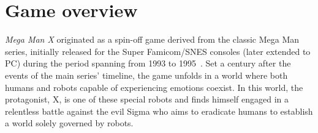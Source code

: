 \chapter{Game overview}
\textit{Mega Man X} originated as a spin-off game derived from the classic Mega Man series, initially released for the Super Famicom/SNES consoles (later extended to PC) during the period spanning from 1993 to 1995~\cite{wiki:MMX}. Set a century after the events of the main series' timeline, the game unfolds in a world where both humans and robots capable of experiencing emotions coexist. In this world, the protagonist, X, is one of these special robots and finds himself engaged in a relentless battle against the evil Sigma who aims to eradicate humans to establish a world solely governed by robots.

